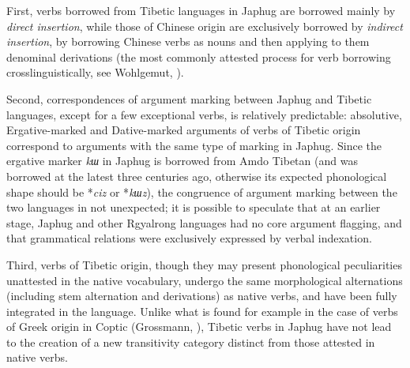 \documentclass[oneside,a4paper,11pt]{article}
\newcommand{\ipa}[1]{{\phon\textit{\mbox{#1}}}} %
\begin{document}
First, verbs borrowed from Tibetic languages in Japhug are borrowed mainly by \textit{direct insertion}, while those of Chinese origin are exclusively borrowed by \textit{indirect insertion}, by borrowing Chinese verbs as nouns and then applying to them denominal derivations (the most commonly attested process for verb borrowing crosslinguistically, see Wohlgemut, \citeyear{wohlgemuth09verbal}). 

Second, correspondences of argument marking between Japhug and Tibetic languages, except for a few exceptional verbs, is relatively predictable: absolutive, Ergative-marked and Dative-marked arguments of verbs of Tibetic origin correspond to arguments with the same type of marking in Japhug. Since the ergative marker \ipa{kɯ} in Japhug is borrowed from Amdo Tibetan (and was borrowed at the latest three centuries ago, otherwise its expected phonological shape should be *\ipa{ciz} or *\ipa{kɯz}), the congruence of argument marking between the two languages in not unexpected; it is possible to speculate that at an earlier stage, Japhug and other Rgyalrong languages  had no core argument flagging, and that grammatical relations were exclusively expressed by verbal indexation.

Third, verbs of Tibetic origin, though they may present phonological peculiarities unattested in the native vocabulary, undergo the same morphological alternations (including stem alternation and derivations) as native verbs, and have been fully integrated in the language. Unlike what is found for example in the case of verbs of Greek origin in Coptic (Grossmann, \citeyear{grossmann16contact}), Tibetic verbs in Japhug have not lead to the creation of a new transitivity category distinct from those attested in native verbs. 
\end{document}
